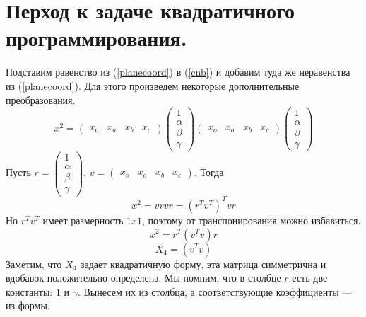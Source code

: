 \documentclass[pdftex,ptm,12pt,a4paper]{report}
\begin{document}
\section{Перход к задаче квадратичного программирования.}
    Подставим равенство из (\ref{planecoord}) в (\ref{cnb}) и добавим туда же неравенства из (\ref{planecoord}).
    Для этого произведем некоторые дополнительные преобразования.
    \[
      x^2 = \begin{pmatrix} x_o & x_a & x_b & x_c \end{pmatrix}
             \begin{pmatrix} 1 \\ \alpha \\ \beta \\ \gamma \end{pmatrix}
             \begin{pmatrix} x_o & x_a & x_b & x_c \end{pmatrix}
             \begin{pmatrix} 1 \\ \alpha \\ \beta \\ \gamma \end{pmatrix}
    \]
    Пусть $r = \begin{pmatrix} 1 \\ \alpha \\ \beta \\ \gamma \end{pmatrix} $,
          $v = \begin{pmatrix} x_o & x_a & x_b & x_c \end{pmatrix}$.
    Тогда
    \[
      x^2 = v r v r = (r^T v^T)^T v r
    \]
    Но $r^T v^T$ имеет размерность $1x1$, поэтому от транспонирования можно избавиться.
    \[
      x^2 = r^T (v^T v) r
    \]\[
      X_4 = (v^T v)
    \]
    Заметим, что $X_4$ задает квадратичную форму, эта матрица симметрична и вдобавок положительно определена.
    Мы помним, что в столбце $r$ есть две константы: $1$ и $\gamma$.
    Вынесем их из столбца, а соответствующие коэффициенты --- из формы.
\end{document}
